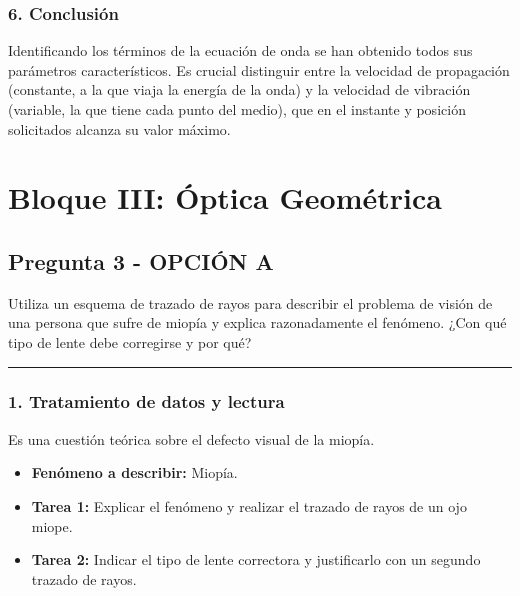 \subsubsection*{6. Conclusión}
\begin{cajaconclusion}
Identificando los términos de la ecuación de onda se han obtenido todos sus parámetros característicos. Es crucial distinguir entre la velocidad de propagación (constante, a la que viaja la energía de la onda) y la velocidad de vibración (variable, la que tiene cada punto del medio), que en el instante y posición solicitados alcanza su valor máximo.
\end{cajaconclusion}

\newpage

\section{Bloque III: Óptica Geométrica}
\label{sec:optica_2018_jun_ord}

\subsection{Pregunta 3 - OPCIÓN A}
\label{subsec:3A_2018_jun_ord}
\begin{cajaenunciado}
Utiliza un esquema de trazado de rayos para describir el problema de visión de una persona que sufre de miopía y explica razonadamente el fenómeno. ¿Con qué tipo de lente debe corregirse y por qué?
\end{cajaenunciado}
\hrule

\subsubsection*{1. Tratamiento de datos y lectura}
Es una cuestión teórica sobre el defecto visual de la miopía.
\begin{itemize}
    \item \textbf{Fenómeno a describir:} Miopía.
    \item \textbf{Tarea 1:} Explicar el fenómeno y realizar el trazado de rayos de un ojo miope.
    \item \textbf{Tarea 2:} Indicar el tipo de lente correctora y justificarlo con un segundo trazado de rayos.
\end{itemize}

